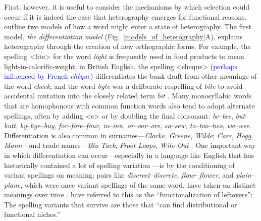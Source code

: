 \documentclass[doc,biblatex]{apa7}
\newcommand\newmaterial[1]{\textcolor{blue}{#1}}
\begin{document}
First, however, it is useful to consider the mechanisms by which selection could occur if it is indeed the case that heterography emerges for functional reasons. \textcite[pp.~325--326]{Berg:2021} outline two models of how a word might enter a state of heterography. The first model, \textit{the differentiation model} (Fig.~\ref{models_of_heterography}A), explains heterography through the creation of new orthographic forms. For example, the spelling <lite> for the word \textit{light} is frequently used in food products to mean light-in-calorific-weight; in British English, the spelling <cheque> (\newmaterial{perhaps influenced by French \textit{chèque}}) differentiates the bank draft from other meanings of the word \textit{check}; and the word \textit{byte} was a deliberate respelling of \textit{bite} to avoid accidental mutation into the closely related term \textit{bit} \parencite{Buchholz:1977}. Many monosyllabic words that are homophonous with common function words also tend to adopt alternate spellings, often by adding <e> or by doubling the final consonant: \textit{be}--\textit{bee}, \textit{but}--\textit{butt}, \textit{by}--\textit{bye}--\textit{buy}, \textit{for}--\textit{fore}--\textit{four}, \textit{in}--\textit{inn}, \textit{or}--\textit{oar}--\textit{ore}, \textit{so}--\textit{sew}, \textit{to}--\textit{too}--\textit{two}, \textit{we}--\textit{wee}. Differentiation is also common in surnames---\textit{Clarke}, \textit{Greene}, \textit{Wilde}; \textit{Carr}, \textit{Hogg}, \textit{Mann}---and trade names---\textit{Blu Tack}, \textit{Froot Loops}, \textit{Wite-Out} \parencite[§~6]{Carney:1994}. One important way in which differentiation can occur---especially in a language like English that has historically contained a lot of spelling variation \parencite{Nevalainen:2012, Stenroos:2016}---is by the conditioning of variant spellings on meaning; pairs like \textit{discreet}--\textit{discrete}, \textit{flour}--\textit{flower}, and \textit{plain}--\textit{plane}, which were once variant spellings of the same word, have taken on distinct meanings over time \parencite[§~5.4]{Carney:1994}. \textcite[p.~58]{Berg:2017} have referred to this as the ``functionalization of leftovers'': The spelling variants that survive are those that ``can find distributional or functional niches.''
\end{document}
